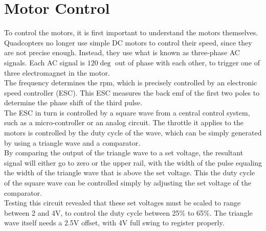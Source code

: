 \documentclass[11pt]{article} %
\begin{document}
\section{Motor Control}
To control the motors, it is first important to understand the motors themselves. Quadcopters no longer use simple DC motors to control their speed, since they are not precise enough. Instead, they use what is known as three-phase AC signals. Each AC signal is $120\deg$ out of phase with each other, to trigger one of three electromagnet in the motor.\\
The frequency determines the rpm, which is precisely controlled by an electronic speed controller (ESC). This ESC measures the back emf of the first two poles to determine the phase shift of the third pulse.\\
The ESC in turn is controlled by a square wave from a central control system, such as a micro-controller or an analog circuit. The throttle it applies to the motors is controlled by the duty cycle of the wave, which can be simply generated by using a triangle wave and a comparator.\\
By comparing the output of the triangle wave to a set voltage, the resultant signal will either go to zero or the upper rail, with the width of the pulse equaling the width of the triangle wave that is above the set voltage. This the duty cycle of the square wave can be controlled simply by adjusting the set voltage of the comparator.\\
Testing this circuit revealed that these set voltages must be scaled to range between 2 and 4V, to control the duty cycle between 25\% to 65\%. The triangle wave itself needs a 2.5V offset, with 4V full swing to register properly.
\end{document}
